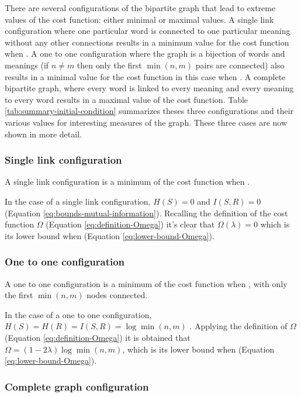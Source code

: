 There are several configurations of the bipartite graph that lead to extreme values of the cost function: either minimal or maximal values.
A single link configuration where one particular word is connected to one particular meaning without any other connections results in a minimum value for the cost function when \lambdaZeroToHalf{}.
A one to one configuration where the graph is a bijection of words and meanings (if $n \neq m$ then only the first $\min(n,m)$ pairs are connected) also results in a minimal value for the cost function in this case when \lambdaHalfToOne{}.
A complete bipartite graph, where every word is linked to every meaning and every meaning to every word results in a maximal value of the cost function.
Table \ref{tab:summary-initial-condition} summarizes theses three configurations and their various values for interesting measures of the graph.
These three cases are now shown in more detail.

\subsubsection{Single link configuration}

A single link configuration is a minimum of the cost function when \lambdaZeroToHalf{}.

In the case of a single link configuration, $H(S)=0$ \cite{Cover1999} and $I(S,R)=0$ (Equation \eqref{eq:bounds-mutual-information}).
Recalling the definition of the cost function $\Omega$ (Equation \eqref{eq:definition-Omega}) it's clear that $\Omega(\lambda)=0$ which is its lower bound when \lambdaZeroToHalf{} (Equation \eqref{eq:lower-bound-Omega}).

\subsubsection{One to one configuration}

A one to one configuration is a minimum of the cost function when \lambdaZeroToHalf{}, with only the first $\min(n,m)$ nodes connected.

In the case of a one to one configuration, $H(S)=H(R)=I(S,R)=\log\min(n,m)$ \cite{Cover1999}.
Applying the definition of $\Omega$ (Equation \eqref{eq:definition-Omega}) it is obtained that $\Omega=(1-2\lambda) \log \min(n,m)$, which is its lower bound when \lambdaHalfToOne{} (Equation \eqref{eq:lower-bound-Omega}).

\subsubsection{Complete graph configuration}

